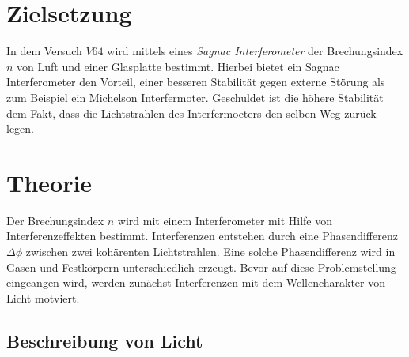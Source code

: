 \setcounter{page}{1}
\section*{Zielsetzung}
In dem Versuch $V64$ wird mittels eines \emph{Sagnac Interferometer}
der Brechungsindex $n$ von Luft und einer Glasplatte bestimmt.
Hierbei bietet ein Sagnac Interferometer den Vorteil, einer
besseren Stabilität gegen externe Störung als zum Beispiel
ein Michelson Interfermoter. Geschuldet ist die höhere Stabilität
dem Fakt, dass die Lichtstrahlen des Interfermoeters den selben Weg zurück legen.

\section{Theorie}
Der Brechungsindex $n$ wird mit einem Interferometer mit Hilfe von
Interferenzeffekten bestimmt. Interferenzen entstehen durch
eine Phasendifferenz $\Delta\phi$ zwischen zwei kohärenten Lichtstrahlen.
Eine solche Phasendifferenz wird in Gasen und Festkörpern unterschiedlich erzeugt.
Bevor auf diese Problemstellung eingeangen wird, werden zunächst Interferenzen
mit dem Wellencharakter von Licht motviert.
\subsection{Beschreibung von Licht}

